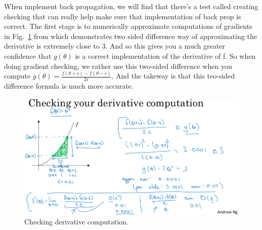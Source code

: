 \documentclass[a4paper]{article}
\begin{document}
When implement back propagation, we will find that there's a test called creating checking that can really help make sure that implementation of back prop is correct. The first stage is to numerically approximate computations of gradients in Fig.~\ref{p14} from which demonstrates two sided difference way of approximating the derivative is extremely close to 3. And so this gives you a much greater confidence that $g(\theta)$ is a correct implementation of the derivative of f. So when doing gradient checking, we rather use this two-sided difference when you compute $g(\theta)=\frac{f(\theta+\epsilon)-f(\theta-\epsilon)}{2\epsilon}$. And the takeway is that this teo-sided difference formula is much more accurate.
\begin{figure}
	\begin{center}
		\includegraphics[scale=0.3]{figures/15.png}
	\end{center}
	\caption{Checking derivative computation.}
	\label{p14}
\end{figure}
\end{document}
